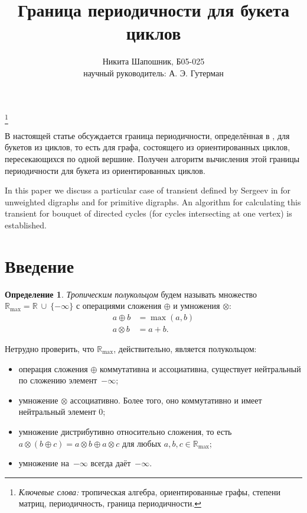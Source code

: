 \documentclass[12pt]{article}
\title{Граница периодичности для букета циклов}
\author{Никита Шапошник, Б05-025\\ научный руководитель: А. Э. Гутерман}
\date{}
\theoremstyle{definition}
\newtheorem{definition}[theorem]{Определение}
\newcommand\blfootnote[1]{%
  \begingroup
  \renewcommand\thefootnote{}\footnote{#1}%
  \addtocounter{footnote}{-1}%
  \endgroup
}
\begin{document}
\maketitle

\blfootnote{\textit{Ключевые слова:} тропическая алгебра, ориентированные графы, степени матриц, периодичность, граница периодичности.}

В настоящей статье обсуждается граница периодичности, определённая в \cite{maxPlusAtWork}, для букетов из циклов, то есть для графа, состоящего из ориентированных циклов, пересекающихся по одной вершине. Получен алгоритм вычисления этой границы периодичности для букета из ориентированных циклов.

In this paper we discuss a particular case of transient defined by Sergeev in \cite{maxAlgebraicPowers} for unweighted digraphs and for primitive digraphs. An algorithm for calculating this transient for bouquet of directed cycles (for cycles intersecting at one vertex) is established.

\section{Введение}
\label{definitions}
\begin{definition}
\textit{Тропическим полукольцом} будем называть множество $\mathbb{R}_{\max} = \mathbb{R} \ \cup ~\{-\infty\}$ с операциями сложения $\oplus$ и умножения $\otimes$: \begin{align*}
            a \oplus b &= \max(a, b)\\
            a \otimes b &= a + b.
        \end{align*}
\end{definition}

Нетрудно проверить, что $\mathbb{R}_{\max}$, действительно, является полукольцом:
\begin{itemize}
\item операция сложения $\oplus$ коммутативна и ассоциативна, существует нейтральный по сложению элемент~$-\infty$;
\item умножение $\otimes$ ассоциативно. Более того, оно коммутативно и имеет нейтральный элемент $0$;
\item умножение дистрибутивно относительно сложения, то есть $a \otimes (b \oplus c) = a \otimes b \oplus a \otimes c$ для любых $a, b, c \in \mathbb{R}_{\max}$;
\item умножение на~$-\infty$ всегда даёт~$-\infty$.
\end{itemize}
\end{document}
